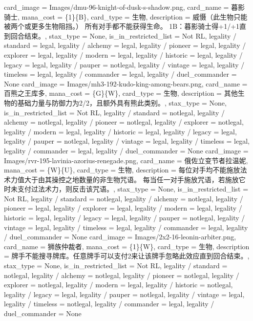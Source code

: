 \documentclass[lang = cn, color = black, 10pt]{AllThatStax}
\begin{document}
\card
{
	card_image = Images/dmu-96-knight-of-dusk-s-shadow.png,
	card_name = 暮影骑士,
	mana_cost = \{1\}\{B\},
	card_type = 生物,
	description = 威慑（此生物只能被两个或更多生物阻挡。）
	所有对手都不能获得生命。
	{1}{B}：暮影骑士得+1/+1直到回合结束。,
	stax_type = None,
	is_in_restricted_list = Not RL,
	legality / standard = legal,
	legality / alchemy = legal,
	legality / pioneer = legal,
	legality / explorer = legal,
	legality / modern = legal,
	legality / historic = legal,
	legality / legacy = legal,
	legality / pauper = notlegal,
	legality / vintage = legal,
	legality / timeless = legal,
	legality / commander = legal,
	legality / duel_commander = None
}
\card
{
	card_image = Images/mh3-192-kudo-king-among-bears.png,
	card_name = 百熊之王库多,
	mana_cost = \{G\}\{W\},
	card_type = 生物,
	description = 其他生物的基础力量与防御力为2/2，且额外具有熊此类别。,
	stax_type = None,
	is_in_restricted_list = Not RL,
	legality / standard = notlegal,
	legality / alchemy = notlegal,
	legality / pioneer = notlegal,
	legality / explorer = notlegal,
	legality / modern = legal,
	legality / historic = legal,
	legality / legacy = legal,
	legality / pauper = notlegal,
	legality / vintage = legal,
	legality / timeless = legal,
	legality / commander = legal,
	legality / duel_commander = None
}
\card
{
	card_image = Images/rvr-195-lavinia-azorius-renegade.png,
	card_name = 俄佐立变节者拉温妮,
	mana_cost = \{W\}\{U\},
	card_type = 生物,
	description = 每位对手均不能施放法术力值大于由其操控之地数量的非生物咒语。
	每当任一对手施放咒语，若施放它时未支付过法术力，则反击该咒语。,
	stax_type = None,
	is_in_restricted_list = Not RL,
	legality / standard = notlegal,
	legality / alchemy = notlegal,
	legality / pioneer = legal,
	legality / explorer = legal,
	legality / modern = legal,
	legality / historic = legal,
	legality / legacy = legal,
	legality / pauper = notlegal,
	legality / vintage = legal,
	legality / timeless = legal,
	legality / commander = legal,
	legality / duel_commander = None
}
\card
{
	card_image = Images/2x2-16-leonin-arbiter.png,
	card_name = 狮族仲裁者,
	mana_cost = \{1\}\{W\},
	card_type = 生物,
	description = 牌手不能搜寻牌库。任意牌手可以支付{2}来让该牌手忽略此效应直到回合结束。,
	stax_type = None,
	is_in_restricted_list = Not RL,
	legality / standard = notlegal,
	legality / alchemy = notlegal,
	legality / pioneer = notlegal,
	legality / explorer = notlegal,
	legality / modern = legal,
	legality / historic = notlegal,
	legality / legacy = legal,
	legality / pauper = notlegal,
	legality / vintage = legal,
	legality / timeless = notlegal,
	legality / commander = legal,
	legality / duel_commander = None
}
\end{document}

